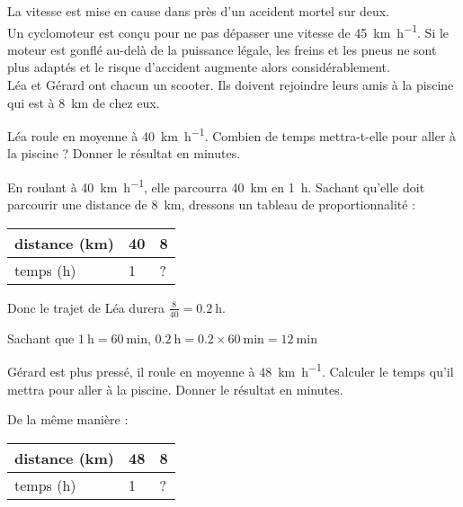 \documentclass[../Cours.tex]{subfiles}
\begin{document}
\begin{questions}
\exercice

La vitesse est mise en cause dans près d’un accident mortel sur deux.\\
Un cyclomoteur est conçu pour ne pas dépasser une vitesse de \qty{45}{\kilo\metre\per\hour}. Si le moteur est gonflé au-delà de la puissance légale, les freins et les pneus ne sont plus adaptés et le risque d’accident augmente alors considérablement.\\

Léa et Gérard ont chacun un scooter. Ils doivent rejoindre leurs amis à la piscine qui est à \qty{8}{\kilo\metre} de chez eux.

\question Léa roule en moyenne à \qty{40}{\kilo\metre\per\hour}. Combien de temps mettra-t-elle pour aller à la piscine ? Donner le résultat en minutes.

{\color{rouge}
    En roulant à \qty{40}{\kilo\metre\per\hour}, elle parcourra \qty{40}{\kilo\metre} en \qty{1}{\hour}. Sachant qu'elle doit parcourir une distance de \qty{8}{\kilo\metre}, dressons un tableau de proportionnalité :

    \begin{center}
    \begin{tabularx}{0.4\linewidth}{|l|X|X|}\hline
        distance (\unit{\kilo\metre}) & 40 & 8 \\\hline
        temps (\unit{\hour}) & 1 & ? \\\hline
    \end{tabularx}
    \end{center}

    Donc le trajet de Léa durera $\frac{8}{40} = \qty{0.2}{\hour}$. 

    Sachant que $\qty{1}{\hour} = \qty{60}{\minute}$, $\qty{0.2}{\hour} = \num{0.2} \times 60~\unit{\minute} = \qty{12}{\minute}$
}

\question Gérard est plus pressé, il roule en moyenne à \qty{48}{\kilo\metre\per\hour}. Calculer le temps qu'il mettra pour aller à la piscine. Donner le résultat en minutes.

{\color{rouge}
    De la même manière : 

    \begin{center}
    \begin{tabularx}{0.4\linewidth}{|l|X|X|}\hline
        distance (\unit{\kilo\metre}) & 48 & 8 \\\hline
        temps (\unit{\hour}) & 1 & ? \\\hline
    \end{tabularx}
    \end{center}

}
\end{questions}
\end{document}

